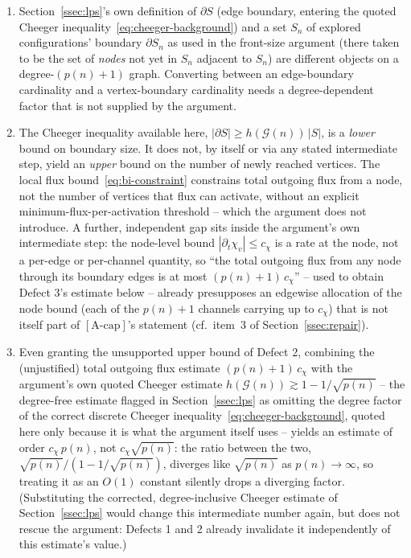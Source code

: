 \documentclass[11pt,a4paper]{article}
\theoremstyle{definition}
\theoremstyle{remark}
\begin{document}
    \begin{enumerate}
      \item[\textbf{Defect 1 (boundary-type mismatch).}]
        Section~\ref{ssec:lps}'s own definition of $\partial S$ (edge boundary, entering the
        quoted Cheeger inequality~\eqref{eq:cheeger-background}) and a set $S_n$ of explored
        configurations' boundary $\partial S_n$ as used in the front-size argument (there
        taken to be the set of \emph{nodes} not yet in $S_n$ adjacent to $S_n$) are different
        objects on a degree-$(p(n)+1)$ graph.
        Converting between an edge-boundary cardinality and a vertex-boundary cardinality
        needs a degree-dependent factor that is not supplied by the argument.

      \item[\textbf{Defect 2 (wrong-direction inequality).}]
        The Cheeger inequality available here,
        $|\partial S| \geq h(\mathcal{G}(n))\,|S|$, is a \emph{lower} bound on boundary size.
        It does not, by itself or via any stated intermediate step, yield an \emph{upper}
        bound on the number of newly reached vertices.
        The local flux bound~\eqref{eq:bi-constraint} constrains total outgoing flux from a
        node, not the number of vertices that flux can activate, without an explicit
        minimum-flux-per-activation threshold -- which the argument does not introduce.
        A further, independent gap sits inside the argument's own intermediate step: the
        node-level bound $|\partial_t \chi_v| \leq c_\chi$ is a rate at the node, not a
        per-edge or per-channel quantity, so ``the total outgoing flux from any node through
        its boundary edges is at most $(p(n)+1)\,c_\chi$'' -- used to obtain Defect 3's
        estimate below -- already presupposes an edgewise allocation of the node bound (each
        of the $p(n)+1$ channels carrying up to $c_\chi$) that is not itself part of
        $[\text{A-cap}]$'s statement (cf.\ item~3 of Section~\ref{ssec:repair}).

      \item[\textbf{Defect 3 (asymptotic error).}]
        Even granting the unsupported upper bound of Defect 2, combining the (unjustified)
        total outgoing flux estimate $(p(n)+1)\,c_\chi$ with the argument's own quoted
        Cheeger estimate $h(\mathcal{G}(n)) \gtrsim 1-1/\sqrt{p(n)}$ -- the degree-free
        estimate flagged in Section~\ref{ssec:lps} as omitting the degree factor of the
        correct discrete Cheeger inequality~\eqref{eq:cheeger-background}, quoted here only
        because it is what the argument itself uses -- yields an estimate of order
        $c_\chi\, p(n)$, not $c_\chi\sqrt{p(n)}$: the ratio between the two,
        $\sqrt{p(n)}/(1-1/\sqrt{p(n)})$, diverges like $\sqrt{p(n)}$ as $p(n)\to\infty$, so
        treating it as an $O(1)$ constant silently drops a diverging factor.
        (Substituting the corrected, degree-inclusive Cheeger estimate of
        Section~\ref{ssec:lps} would change this intermediate number again, but does not
        rescue the argument: Defects 1 and 2 already invalidate it independently of this
        estimate's value.)
    \end{enumerate}
\end{document}
